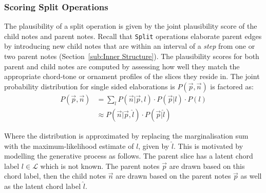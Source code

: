 \documentclass[12pt,a4paper,twoside,openany]{report} \usepackage[pdfborder={0 0 0}]{hyperref}    %
\theoremstyle{definition} \newtheorem{definition}{Definition}[section]
\begin{document}
    \subsubsection{Scoring Split Operations}



    The plausibility of a split operation is given by the joint plausibility score of the child notes and parent notes. 
    Recall that \texttt{Split} operations elaborate parent edges by introducing new child notes that are within an interval of
    a \textit{step} from one or two parent notes (Section~\ref{sub:Inner Structure}). The plausibility scores for both parent and child notes are computed
    by assessing how well they match the appropriate chord-tone or ornament profiles of the slices they reside in.
    The joint probability distribution for single sided elaborations is $P(\vec{p},\vec{n})$ is factored as:
    \begin{equation}
      \begin{aligned}
        P(\vec{p},\vec{n}) &= \sum\limits_l P(\vec{n}| \vec{p}, l)\cdot P(\vec{p} | l) \cdot P(l)\\
                           &\approx P(\vec{n}| \vec{p}, \hat{l})\cdot P(\vec{p} | \hat{l}) 
      \end{aligned}
    \end{equation}

    Where the distribution is approximated by replacing the marginalisation sum with the maximum-likelihood estimate of
    $l$, given by $\hat{l}$. This is motivated by modelling the generative process as follows.
    The parent slice has a latent chord label $l \in \mathcal{L}$ which is not known. The parent notes $\vec{p}$ are
    drawn based on this chord label, then the child notes $\vec{n}$ are drawn based on the parent notes $\vec{p}$ as
    well as the latent chord label $\hat{l}$. 
\end{document}
